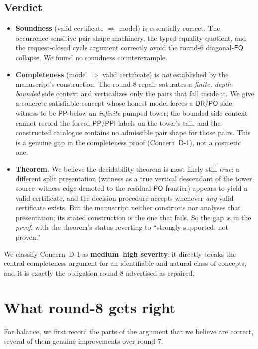 \documentclass[11pt]{article}
\newcommand{\EQ}{\mathsf{EQ}}
\newcommand{\DR}{\mathsf{DR}}
\newcommand{\PO}{\mathsf{PO}}
\newcommand{\PP}{\mathsf{PP}}
\newcommand{\PPI}{\mathsf{PPI}}
\begin{document}
\subsection{Verdict}

\begin{itemize}
\item \textbf{Soundness} (valid certificate $\Rightarrow$ model) is essentially
correct.  The occurrence-sensitive pair-shape machinery, the typed-equality
quotient, and the request-closed cycle argument correctly avoid the round-6
diagonal-$\EQ$ collapse.  We found no soundness counterexample.
\item \textbf{Completeness} (model $\Rightarrow$ valid certificate) is
\emph{not} established by the manuscript's construction.  The round-8 repair
saturates a \emph{finite, depth-bounded} side context and verticalizes only the
pairs that fall inside it.  We give a concrete satisfiable concept whose
honest model forces a $\DR/\PO$ side witness to be $\PP$-below an \emph{infinite}
pumped tower; the bounded side context cannot record the forced $\PP/\PPI$
labels on the tower's tail, and the constructed catalogue contains no admissible
pair shape for those pairs.  This is a genuine gap in the completeness proof
(Concern~D-1), not a cosmetic one.
\item \textbf{Theorem.}  We believe the decidability theorem is most likely
still \emph{true}: a different split presentation (witness as a true vertical
descendant of the tower, source--witness edge demoted to the residual $\PO$
frontier) appears to yield a valid certificate, and the decision procedure
accepts whenever \emph{any} valid certificate exists.  But the manuscript
neither constructs nor analyses that presentation; its stated construction is
the one that fails.  So the gap is in the \emph{proof}, with the theorem's
status reverting to ``strongly supported, not proven.''
\end{itemize}
We classify Concern~D-1 as \textbf{medium--high severity}: it directly breaks the
central completeness argument for an identifiable and natural class of concepts,
and it is exactly the obligation round-8 advertised as repaired.

\section{What round-8 gets right}

For balance, we first record the parts of the argument that we believe are
correct, several of them genuine improvements over round-7.
\end{document}
